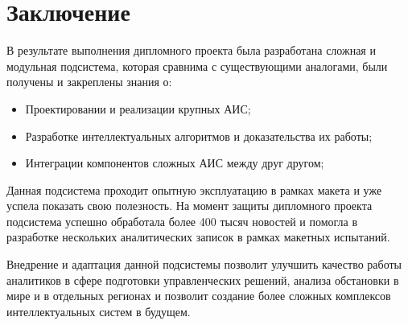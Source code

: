 \section*{Заключение}

В результате выполнения дипломного проекта была разработана сложная и модульная подсистема, которая сравнима с существующими аналогами, были получены и закреплены знания о:
\begin{itemize}
\item Проектировании и реализации крупных АИС;
\item Разработке интеллектуальных алгоритмов и доказательства их работы;
\item Интеграции компонентов сложных АИС между друг другом;
\end{itemize}

Данная подсистема проходит опытную эксплуатацию в рамках макета и уже успела показать свою полезность. На момент защиты дипломного проекта подсистема успешно обработала более 400 тысяч новостей и помогла в разработке нескольких аналитических записок в рамках макетных испытаний.

Внедрение и адаптация данной подсистемы позволит улучшить качество работы аналитиков в сфере подготовки управленческих решений, анализа обстановки в мире и в отдельных регионах и позволит создание более сложных комплексов интеллектуальных систем в будущем.